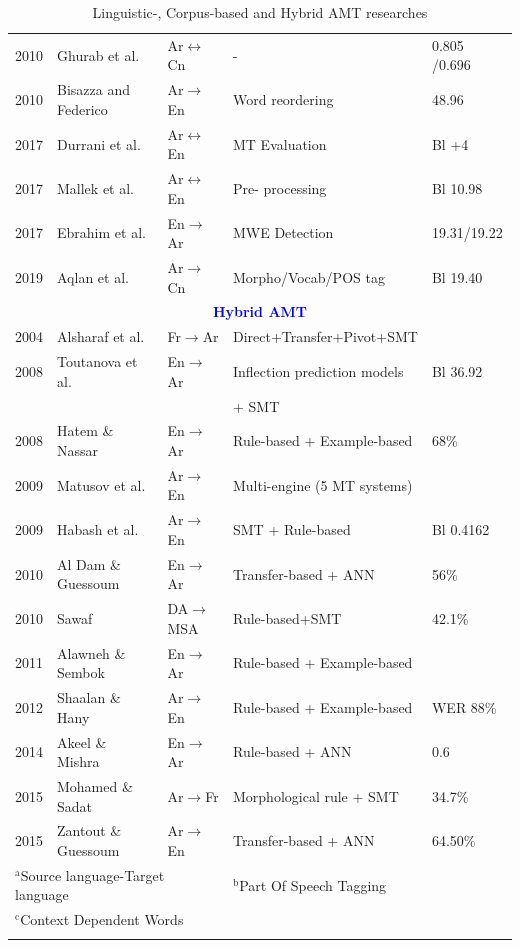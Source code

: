 \begin{small}
\begin{longtable}{|l|l|l|l|l|}
		2010 & Ghurab et al. \cite{ghurab10}			& Ar$\leftrightarrow$Cn &-&0.805%
		/0.696%
		\\
		2010 & Bisazza and Federico \cite{bisazza10}	& Ar$\rightarrow$En &Word reordering& 48.96\\
		2017 & Durrani et al. \cite{durrani17}			& Ar$\leftrightarrow$En &MT Evaluation& Bl +4\\	
		2017 & Mallek et al. \cite{mallek17}			& Ar$\leftrightarrow$En &Pre- processing& Bl 10.98\\
		2017 & Ebrahim et al. \cite{ebrahim17}			& En$\rightarrow$Ar &MWE Detection& 19.31/19.22\\
		2019 & Aqlan et al. \cite{aqlan19a}				& Ar$\rightarrow$Cn &Morpho/Vocab/POS tag& Bl 19.40\\
		\hline
		\multicolumn{5}{c}{\textbf{\textcolor{blue}{Hybrid AMT}}}\\
		\hline
		2004 & Alsharaf et al. \cite{alsharaf04}	& Fr$\rightarrow$Ar& Direct+Transfer+Pivot+SMT &\\
		2008 & Toutanova et al. \cite{toutanova08}	& En$\rightarrow$Ar& Inflection prediction models &Bl 36.92\\
	 & 	& &  + SMT &\\
		2008 & Hatem \& Nassar \cite{hatem08}		& En$\rightarrow$Ar& Rule-based + Example-based & 68\%\\
		2009 & Matusov et al. \cite{matusov09} 		& Ar$\rightarrow$En& Multi-engine (5 MT systems) &\\
		2009 & Habash et al. \cite{habash09}		& Ar$\rightarrow$En& SMT + Rule-based &Bl 0.4162\\
		2010 & Al Dam \& Guessoum \cite{aldam10}   	& En$\rightarrow$Ar& Transfer-based + ANN &56\%\\
		2010 & Sawaf \cite{sawaf10}					& DA$\rightarrow$MSA& Rule-based+SMT & 42.1\%\\
		2011 & Alawneh \& Sembok \cite{alawneh11}	& En$\rightarrow$Ar& Rule-based + Example-based &\\
		2012 & Shaalan \& Hany \cite{shaalan12}		& Ar$\rightarrow$En& Rule-based + Example-based & WER 88\%\\
		2014 & Akeel \& Mishra \cite{akeel14}   	& En$\rightarrow$Ar& Rule-based + ANN & 0.6\\
		2015 & Mohamed \& Sadat	\cite{mohamed15}	& Ar$\rightarrow$Fr& Morphological rule + SMT & 34.7\%\\
		2015 & Zantout \& Guessoum \cite{zantout15}	& Ar$\rightarrow$En& Transfer-based + ANN &64.50\%\\
		\hline
		\multicolumn{3}{l}{$^{\mathrm{a}}$Source language-Target language}&
		\multicolumn{2}{l}{$^{\mathrm{b}}$Part Of Speech Tagging}\\
		\multicolumn{3}{l}{$^{\mathrm{c}}$Context Dependent Words}\\
		\caption{Linguistic-, Corpus-based and Hybrid AMT researches}
		\label{tab_linguistic}\\
	\end{longtable}
\end{small}

